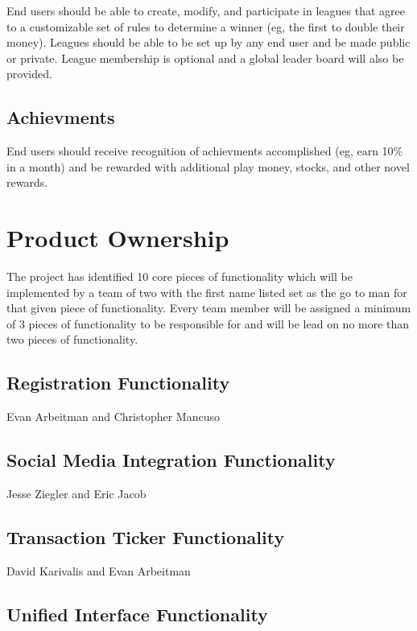 \documentclass[11pt,letterpaper,oneside]{memoir}
\begin{document}
End users should be able to create, modify, and participate in leagues that
agree to a customizable set of rules to determine a winner (eg, the first to
double their money).  Leagues should be able to be set up by any end user and
be made public or private.  League membership is optional and a global
leader board will also be provided.

\section{Achievments}

End users should receive recognition of achievments accomplished (eg, earn 10\% in a month) and
be rewarded with additional play money, stocks, and other novel rewards.

\chapter{Product Ownership}
The project has identified 10 core pieces of functionality which will be implemented by a team of two
with the first name listed set as the go to man for that given piece of functionality.  Every team
member will be assigned a minimum of 3 pieces of functionality to be responsible for and will be
lead on no more than two pieces of functionality.

\section{Registration Functionality}

Evan Arbeitman and Christopher Mancuso

\section{Social Media Integration Functionality}

Jesse Ziegler and Eric Jacob

\section{Transaction Ticker Functionality}

David Karivalis and Evan Arbeitman

\section{Unified Interface Functionality}
\end{document}
